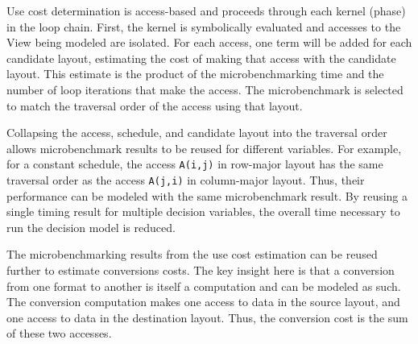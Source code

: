 Use cost determination is access-based and proceeds through each kernel (phase) in the loop chain.
First, the kernel is symbolically evaluated and accesses to the View being modeled are isolated.
For each access, one term will be added for each candidate layout, estimating the cost of making that access with the candidate layout.
This estimate is the product of the microbenchmarking time and the number of loop iterations that make the access.
The microbenchmark is selected to match the traversal order of the access using that layout.

Collapsing the access, schedule, and candidate layout into the traversal order allows microbenchmark results to be reused for different variables. 
For example, for a constant schedule, the access \verb.A(i,j). in row-major layout has the same traversal order as the access \verb.A(j,i). in column-major layout.
Thus, their performance can be modeled with the same microbenchmark result. 
By reusing a single timing result for multiple decision variables, the overall time necessary to run the decision model is reduced.

The microbenchmarking results from the use cost estimation can be reused further to estimate conversions costs.
The key insight here is that a conversion from one format to another is itself a computation and can be modeled as such.
The conversion computation makes one access to data in the source layout, and one access to data in the destination layout. 
Thus, the conversion cost is the sum of these two accesses.

